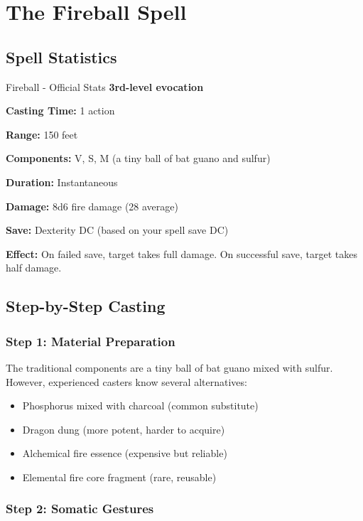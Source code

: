 \documentclass[letterpaper,twocolumn,openany]{dndbook}
\begin{document}
\chapter{The Fireball Spell}

\section{Spell Statistics}

\begin{DndSidebar}{Fireball - Official Stats}
    \textbf{3rd-level evocation}

    \textbf{Casting Time:} 1 action

    \textbf{Range:} 150 feet

    \textbf{Components:} V, S, M (a tiny ball of bat guano and sulfur)

    \textbf{Duration:} Instantaneous

    \textbf{Damage:} 8d6 fire damage (28 average)

    \textbf{Save:} Dexterity DC (based on your spell save DC)

    \textbf{Effect:} On failed save, target takes full damage. On successful save, target takes half damage.
\end{DndSidebar}

\section{Step-by-Step Casting}

\subsection{Step 1: Material Preparation}

The traditional components are a tiny ball of bat guano mixed with sulfur. However, experienced casters know several alternatives:

\begin{itemize}
    \item Phosphorus mixed with charcoal (common substitute)
    \item Dragon dung (more potent, harder to acquire)
    \item Alchemical fire essence (expensive but reliable)
    \item Elemental fire core fragment (rare, reusable)
\end{itemize}

\subsection{Step 2: Somatic Gestures}
\end{document}
